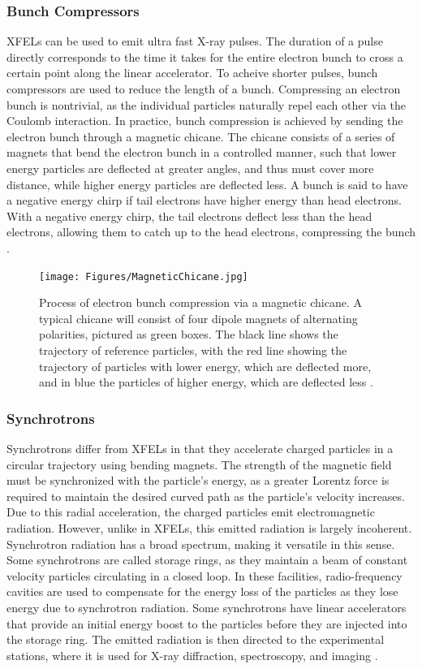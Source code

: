 \documentclass[aps,prb,twocolumn,superscriptaddress]{revtex4-2}
\begin{document}
\subsubsection{Bunch Compressors}
XFELs can be used to emit ultra fast X-ray pulses. The duration of a pulse
directly corresponds to the time it takes for the entire electron bunch to 
cross a certain point along the linear accelerator. To acheive shorter pulses,
bunch compressors are used to reduce the length of a bunch. 
Compressing an electron bunch is nontrivial, as the individual particles 
naturally repel each other via the Coulomb interaction. In practice, bunch 
compression is achieved by sending the electron bunch through a magnetic chicane.
The chicane consists of a series of magnets that bend the electron bunch in a
controlled manner, such that lower energy particles are deflected at greater 
angles, and thus must cover more distance, while higher energy particles are
deflected less. A bunch is said to have a negative energy chirp if tail electrons 
have higher energy than head electrons. With a negative energy chirp, the tail
electrons deflect less than the head electrons, allowing them to catch up to 
the head electrons, compressing the bunch \cite{Hastings2020}.

\begin{figure}[h]
    \centering
    \texttt{[image: Figures/MagneticChicane.jpg]}
    \caption{Process of electron bunch compression via a magnetic chicane.
    A typical chicane will consist of four dipole magnets of alternating
    polarities, pictured as green boxes. The black line shows the trajectory of
    reference particles, with the red line showing the trajectory of particles
    with lower energy, which are deflected more, and in blue the particles of
    higher energy, which are deflected less \cite{Hastings2020}.}
    \label{fig:Undulator}
\end{figure}

\subsubsection{Synchrotrons}
Synchrotrons differ from XFELs in that they accelerate charged particles in a
circular trajectory using bending magnets. The strength of the magnetic field
must be synchronized with the particle's energy, as a greater Lorentz force is
required to maintain the desired curved path as the particle's velocity
increases. Due to this radial acceleration, the charged particles emit
electromagnetic radiation. However, unlike in XFELs, this emitted radiation is
largely incoherent. Synchrotron radiation has a broad spectrum, making it 
versatile in this sense. Some synchrotrons are called storage rings, as they
maintain a beam of constant velocity particles circulating in a closed loop. 
In these facilities, radio-frequency cavities are used to compensate for the 
energy loss of the particles as they lose energy due to synchrotron radiation. 
Some synchrotrons have linear accelerators that provide an initial energy boost
to the particles before they are injected into the storage ring.
The emitted radiation is then directed to the experimental stations, where it is
used for X-ray diffraction, spectroscopy, and imaging \cite{Wiedemann2004}.
\end{document}
